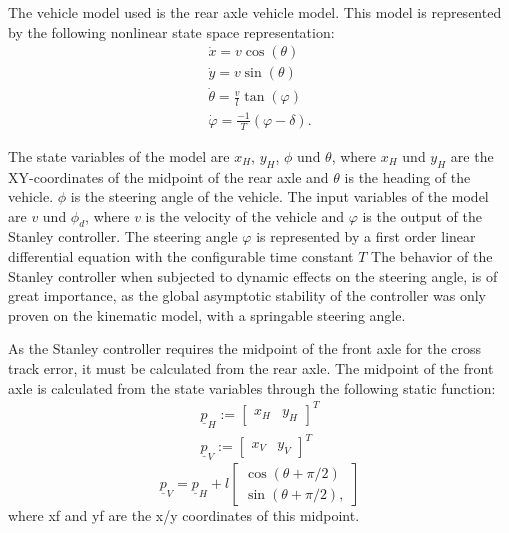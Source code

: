 \documentclass[arbeit=studie,oneside,BCOR=12mm]{ArbeitRST}
\begin{document}
The vehicle model used is the rear axle vehicle model. This model is
represented by the following nonlinear state space representation: 
\begin{gather}
    \dot{x} = v \cos(\theta) \\
    \dot{y} = v \sin(\theta) \\
    \dot{\theta} = \frac{v}{l}\tan(\varphi) \\
    \dot{\varphi} = \frac{-1}{T}\left(\varphi - \delta\right).
\end{gather}

The state variables of the model are $x_H$, $y_H$, $\phi$ und $\theta$, where
$x_H$ und $y_H$ are the XY-coordinates of the midpoint of the rear axle and
$\theta$ is the heading of the vehicle. $\phi$ is the steering angle of the
vehicle. The input variables of the model are $v$ und $\phi_d$, where $v$ is
the velocity of the vehicle and $\varphi$ is the output of the Stanley
controller. The steering angle $\varphi$ is represented by a first order linear
differential equation with the configurable time constant $T$  The behavior of
the Stanley controller when subjected to dynamic effects on the steering angle,
is of great importance, as the global asymptotic stability of the controller
was only proven on the kinematic model, with a springable steering angle. 

As the Stanley controller requires the midpoint of the front axle for the cross
track error, it must be calculated from the rear axle. The midpoint of the
front axle is calculated from the state variables through the following static
function:
\begin{gather}
    \underline{p}_H := 
    \begin{bmatrix}
        x_H & y_H
    \end{bmatrix}^T \\
    \underline{p}_V := 
    \begin{bmatrix}
        x_V & y_V
    \end{bmatrix}^T
    \label{eq:Hinterradachse und Vorderradachse}
\end{gather}
\begin{equation}
    \underline{p}_V = \underline{p}_H + l 
    \begin{bmatrix}
        \cos(\theta + \pi/2) \\ 
        \sin(\theta + \pi/2),
    \end{bmatrix}
    \label{eq:Transformation von Hinterradachse zu Vorderradachse}
\end{equation}
where xf and yf are the x/y coordinates of this midpoint. 
\end{document}
